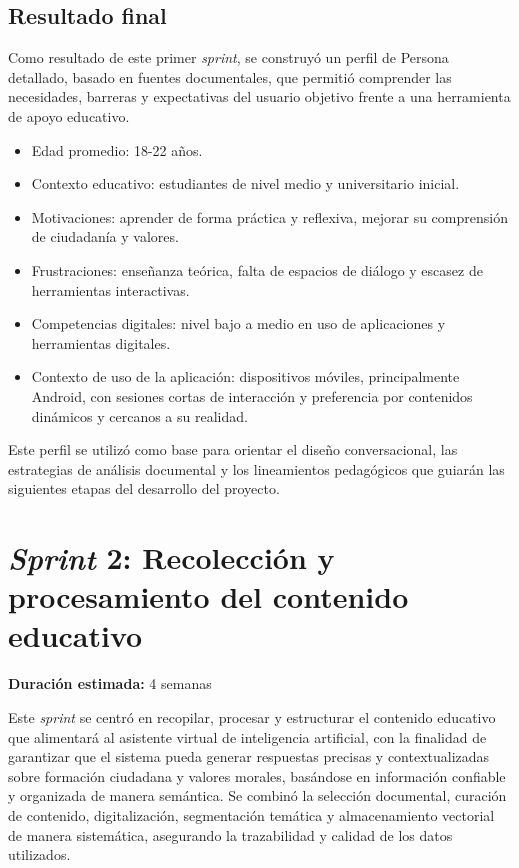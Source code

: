 \subsection{Resultado final}
Como resultado de este primer \textit{sprint}, se construyó un perfil de
Persona detallado, basado en fuentes documentales, que permitió comprender las
necesidades, barreras y expectativas del usuario objetivo frente a una
herramienta de apoyo educativo.

\begin{itemize}
      \item Edad promedio: 18-22 años.
      \item Contexto educativo: estudiantes de nivel medio y universitario inicial.
      \item Motivaciones: aprender de forma práctica y reflexiva, mejorar su comprensión de
            ciudadanía y valores.
      \item Frustraciones: enseñanza teórica, falta de espacios de diálogo y escasez de
            herramientas interactivas.
      \item Competencias digitales: nivel bajo a medio en uso de aplicaciones y
            herramientas digitales.
      \item Contexto de uso de la aplicación: dispositivos móviles, principalmente Android,
            con sesiones cortas de interacción y preferencia por contenidos dinámicos y
            cercanos a su realidad.
\end{itemize}

Este perfil se utilizó como base para orientar el diseño conversacional, las
estrategias de análisis documental y los lineamientos pedagógicos que guiarán
las siguientes etapas del desarrollo del proyecto.

\section{\textit{Sprint} 2: Recolección y procesamiento del contenido educativo}
\textbf{Duración estimada:} 4 semanas

Este \textit{sprint} se centró en recopilar, procesar y estructurar el
contenido educativo que alimentará al asistente virtual de inteligencia
artificial, con la finalidad de garantizar que el sistema pueda generar
respuestas precisas y contextualizadas sobre formación ciudadana y valores
morales, basándose en información confiable y organizada de manera semántica.
Se combinó la selección documental, curación de contenido, digitalización,
segmentación temática y almacenamiento vectorial de manera sistemática,
asegurando la trazabilidad y calidad de los datos utilizados.

